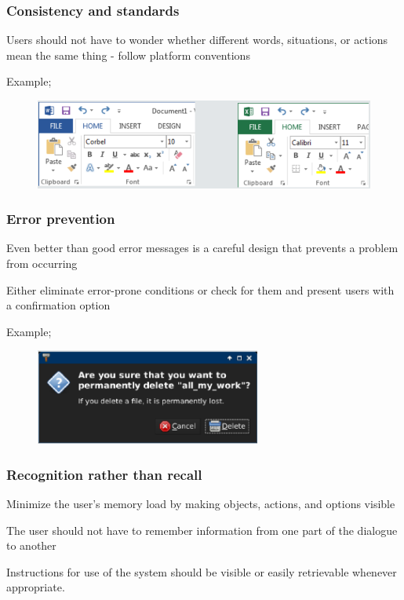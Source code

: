 \documentclass[]{project_plan}
\begin{document}
\subsubsection{Consistency and standards}
Users should not have to wonder whether different words, situations, or actions mean
the same thing - follow platform conventions

Example;
\begin{figure}[h!]
  \centering
  \includegraphics[width=\linewidth]{consistency_and_standards_example.png}
\end{figure}

\newpage

\subsubsection{Error prevention}
Even better than good error messages is a careful design that prevents a problem
from occurring

Either eliminate error-prone conditions or check for them and present users with a
confirmation option

Example;
\begin{figure}[h!]
  \centering
  \includegraphics[width=20em]{error_prevention_example.png}
\end{figure}

\subsubsection{Recognition rather than recall}
Minimize the user's memory load by making objects, actions, and options visible

The user should not have to remember information from one part of the dialogue to
another

Instructions for use of the system should be visible or easily retrievable whenever
appropriate.
\end{document}
